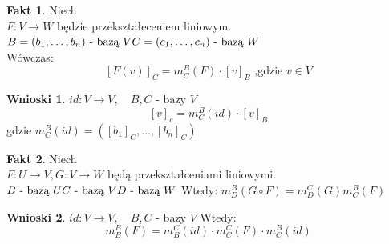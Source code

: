 \documentclass[12pt,a4paper]{article}
\theoremstyle{plain}
\theoremstyle{definition}
\newtheorem{ft}{Fakt}[section]
\theoremstyle{definition}
\theoremstyle{definition}
\theoremstyle{definition}
\theoremstyle{definition}
\theoremstyle{definition}
\theoremstyle{definition}
\theoremstyle{definition}
\theoremstyle{definition}
\newtheorem*{wn}{Wnioski}
\begin{document}
\begin{ft}
    Niech \\ $ F: V \rightarrow W $ będzie przekształeceniem liniowym.\\
    $ B = (b_1, \ldots , b_n) \text{ - bazą } V \\
      C = (c_1, \ldots , c_n) \text{ - bazą } W $ \\
    Wówczas:
    $$ [F(v)]_C = m^B_C(F) \cdot [v]_B \text{ ,gdzie } v \in V$$
\end{ft}

\begin{wn}
    $ id: V \rightarrow V,\quad B, C \text{ - bazy } V$
    $$ [v]_c = m^B_C(id) \cdot [v]_B $$
    gdzie $ m^B_C(id) = ( [b_1]_C, \ldots , [b_n]_C)$
\end{wn}

\begin{ft}
    Niech \\ $ F: U \rightarrow V, G: V \rightarrow W $ będą przekształceniami liniowymi.\\
  $ B \text{ - bazą } U\\
    C \text{ - bazą } V\\
    D \text{ - bazą } W\\ $
Wtedy: $m^B_D(G \circ F) = m^C_D(G) m^B_C(F)$
\end{ft}
\begin{wn}
$ id: V \rightarrow V,\quad B, C \text{ - bazy } V$
    Wtedy: $$ m^B_B(F) = m^C_B(id) \cdot m^C_C(F) \cdot m^B_C(id)$$

\end{wn}
\end{document}

